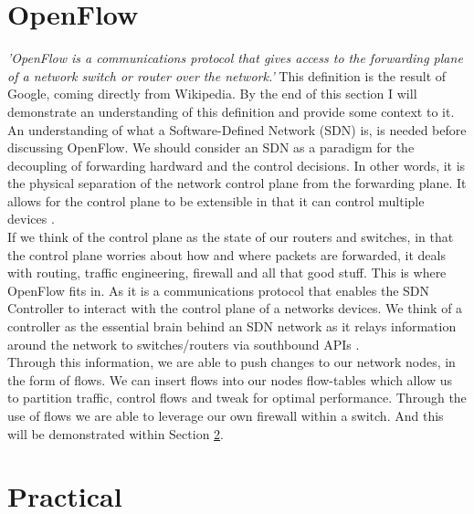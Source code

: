 \section{OpenFlow}
\textit{'OpenFlow is a communications protocol that gives access to the forwarding plane of a network switch or router over the network.'} \citep{wikipedia_2018} This definition is the result of Google, coming directly from Wikipedia. By the end of this section I will demonstrate an understanding of this definition and provide some context to it.
\\An understanding of what a Software-Defined Network (SDN) is, is needed before discussing OpenFlow. We should consider an SDN as a paradigm for the decoupling of forwarding hardward and the control decisions. In other words, it is the physical separation of the network control plane from the forwarding plane. It allows for the control plane to be extensible in that it can control multiple devices \citep{open_net}.
\\If we think of the control plane as the state of our routers and switches, in that the control plane worries about how and where packets are forwarded, it deals with routing, traffic engineering, firewall and all that good stuff. This is where OpenFlow fits in. As it is a communications protocol that enables the SDN Controller to interact with the control plane of a networks devices. We think of a controller as the essential brain behind an SDN network as it relays information around the network to switches/routers via southbound APIs \citep{sdxcentral}.
\\Through this information, we are able to push changes to our network nodes, in the form of flows. We can insert flows into our nodes flow-tables which allow us to partition traffic, control flows and tweak for optimal performance. Through the use of flows we are able to leverage our own firewall within a switch. And this will be demonstrated within Section \ref{sub:prat}.
\clearpage
\section{Practical}
\label{sub:prat}
